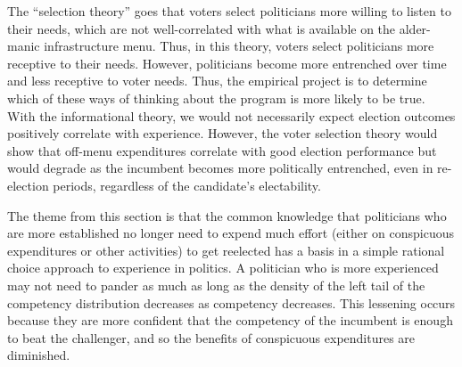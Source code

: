 The ``selection theory'' goes that voters select politicians more willing to listen to their needs, which are not well-correlated with what is available on the alder-manic infrastructure menu. 
Thus, in this theory, voters select politicians more receptive to their needs. 
However, politicians become more entrenched over time and less receptive to voter needs. 
Thus, the empirical project is to determine which of these ways of thinking about the program is more likely to be true. 
With the informational theory, we would not necessarily expect election outcomes positively correlate with experience. 
However, the voter selection theory would show that off-menu expenditures correlate with good election performance but would degrade as the incumbent becomes more politically entrenched, even in re-election periods, regardless of the candidate's electability. 

The theme from this section is that the common knowledge that politicians who are more established no longer need to expend much effort (either on conspicuous expenditures or other activities) to get reelected has a basis in a simple rational choice approach to experience in politics. 
A politician who is more experienced may not need to pander as much as long as the density of the left tail of the competency distribution decreases as competency decreases. 
This lessening occurs because they are more confident that the competency of the incumbent is enough to beat the challenger, and so the benefits of conspicuous expenditures are diminished. 